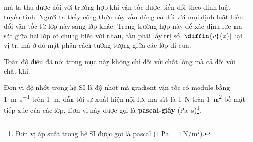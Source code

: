 
 mà ta thu được đối với trường hợp khi vận tốc được biến đổi theo định luật tuyến tính. Người ta thấy công thức này vẫn đúng cả đối với mọi định luật biến đổi vận tốc từ lớp này sang lớp khác. Trong trường hợp này để xác định lực ma sát giữa hai lớp có chung biên với nhau, cần phải lấy trị số $|\diffin{v}{z}|$ tại vị trí mà ở đó mặt phân cách tưởng tượng giữa các lớp đi qua.


Toàn độ điều đã nói trong mục này không chỉ đối với chất lỏng mà cả đối với chất khí.


Đơn vị độ nhớt trong hệ SI là độ nhớt mà gradient vận tốc có module bằng \SI{1}{\metre\per\second} trên \SI{1}{\metre}, dẫn tới sự xuất hiện nội lực ma sát là \SI{1}{\newton} trên \SI{1}{\metre\squared} bề mặt tiếp xúc của các lớp. Đơn vị này được gọi là \textbf{pascal-giây} (\si{\pascal\second})\footnote{Đơn vị áp suất trong hệ SI được gọi là pascal ($\SI{1}{\pascal}=\SI{1}{\newton\per\metre\squared}$).}.


